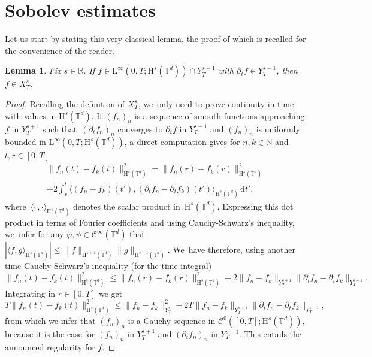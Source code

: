 \documentclass[JEP,XML,SOM,Unicode,published]{cedram}
\newtheorem{lem}[prop]{Lemma}
\theoremstyle{definition}
\newcommand\R{\mathbb{R}}
\newcommand\N{\mathbb{N}}
\newcommand\T{\mathbb{T}}
\newcommand\dd{\mathrm{d}}
\renewcommand\H{\mathrm{H}}
\renewcommand\L{\mathrm{L}}
\begin{document}
\section{Sobolev estimates}\label{sec:sobo}
Let us start by stating this very classical lemma, the proof of which is recalled for the convenience of the reader.
\begin{lem}\label{lem:sobo1}
Fix $s\in\R$. If $f\in \L^\infty(0,T;\H^s(\T^d)) \cap Y_T^{s+1}$ with $\partial_t f \in Y_T^{s-1}$, then $f\in X_T^s$.
\end{lem}
\begin{proof}
Recalling the definition of $X_T^s$, we~only need to prove continuity in time with values in $\H^s(\T^d)$. If $(f_n)_n$ is a sequence of smooth functions approaching $f$ in $Y_T^{s+1}$ such that~$(\partial_t f_n)_n$ converges to $\partial_t f$ in $Y_T^{s-1}$ and $(f_n)_n$ is uniformly bounded in $\L^\infty(0,T;\H^s(\T^d))$, a direct computation gives for $n,k\in\N$ and $t,r\in[0,T]$
\begin{multline*}
\|f_n(t)-f_k(t)\|_{\H^s(\T^d)}^2 = \|f_n(r)-f_k(r)\|_{\H^s(\T^d)}^2 \\+2 \int_r^t \big\langle (f_n-f_k)(t'),(\partial_t f_n-\partial_t f_k)(t') \big\rangle_{\H^s(\T^d)}\,\dd t',
\end{multline*}
where~$\langle \cdot\,,\cdot \rangle_{\H^s(\T^d)}$ denotes the scalar product in~$\H^s(\T^d)$. Expressing this dot product in terms of Fourier coefficients and using Cauchy-Schwarz's inequality, we~infer for any $\varphi,\psi\in\mathscr{C}^\infty(\T^d)$ that $|\langle f,g\rangle_{\H^s(\T^d)}|\leq \|f\|_{\H^{s+1}(\T^d)}\|g\|_{\H^{s-1}(\T^d)}$. We~have therefore, using another time Cauchy-Schwarz's inequality (for the time integral)
\[
\|f_n(t)-f_k(t)\|_{\H^s(\T^d)}^2 \leq \|f_n(r)-f_k(r)\|_{\H^s(\T^d)}^2 + 2\|f_n-f_k\|_{Y_T^{s+1}}\|\partial_t f_n -\partial_t f_k\|_{Y_T^{s-1}}.
\]
Integrating in $r\in[0,T]$ we get
\[
T\|f_n(t)-f_k(t)\|_{\H^s(\T^d)}^2 \leq \|f_n-f_k\|_{Y_T^s}^2 + 2T \|f_n-f_k\|_{Y_T^{s+1}}\|\partial_t f_n -\partial_t f_k\|_{Y_T^{s-1}},
\]
from which we infer that $(f_n)_n$ is a Cauchy sequence in $\mathscr{C}^0([0,T];\H^s(\T^d))$, because it is the case for $(f_n)_n$ in $Y_T^{s+1}$ and $(\partial_t f_n)_n$ in $Y_T^{s-1}$. This entails the announced regularity for $f$.
\end{proof}
\end{document}
